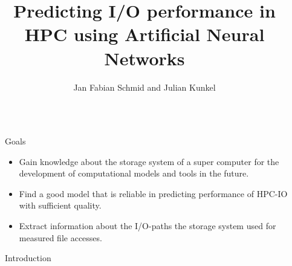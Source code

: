 \documentclass[final]{beamer}
\title{Predicting I/O performance in HPC using Artificial Neural Networks} %
\author{Jan Fabian Schmid and Julian Kunkel} %
\institute{Universität Hamburg} %
\newlength{\sepwid}
\newlength{\onecolwid}
\begin{document}
	
	\small


\setlength{\belowcaptionskip}{2ex} %
\setlength\belowdisplayshortskip{2ex} %

\begin{frame}[t] %

\begin{columns}[t] %

\begin{column}{\sepwid}\end{column} %

\begin{column}{\onecolwid} %


\begin{alertblock}{Goals}


\begin{itemize}
\item Gain knowledge about the storage system of a super computer for the development of computational models and tools in the future.
\item Find a good model that is reliable in predicting performance of HPC-IO with sufficient quality.
\item Extract information about the I/O-paths the storage system used for measured file accesses.
\end{itemize}

\end{alertblock}


\begin{block}{Introduction}
	

\end{block}
\end{column}
\end{columns}
\end{frame}
\end{document}
